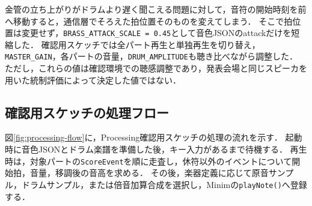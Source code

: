 \documentclass[uplatex,dvipdfmx]{jlreq}
\begin{document}
金管の立ち上がりがドラムより遅く聞こえる問題に対して，音符の開始時刻を前へ移動すると，通信層でそろえた拍位置そのものを変えてしまう．
そこで拍位置は変更せず，\texttt{BRASS\_ATTACK\_SCALE = 0.45}として音色JSONのattackだけを短縮した．
確認用スケッチでは全パート再生と単独再生を切り替え，\texttt{MASTER\_GAIN}，各パートの音量，\texttt{DRUM\_AMPLITUDE}も聴き比べながら調整した．
ただし，これらの値は確認環境での聴感調整であり，発表会場と同じスピーカを用いた統制評価によって決定した値ではない．

\subsection{確認用スケッチの処理フロー}
図\ref{fig:processing-flow}に，Processing確認用スケッチの処理の流れを示す．
起動時に音色JSONとドラム楽譜を準備した後，キー入力があるまで待機する．
再生時は，対象パートの\texttt{ScoreEvent}を順に走査し，休符以外のイベントについて開始拍，音量，移調後の音高を求める．
その後，楽器定義に応じて原音サンプル，ドラムサンプル，または倍音加算合成を選択し，Minimの\texttt{playNote()}へ登録する．
\end{document}
